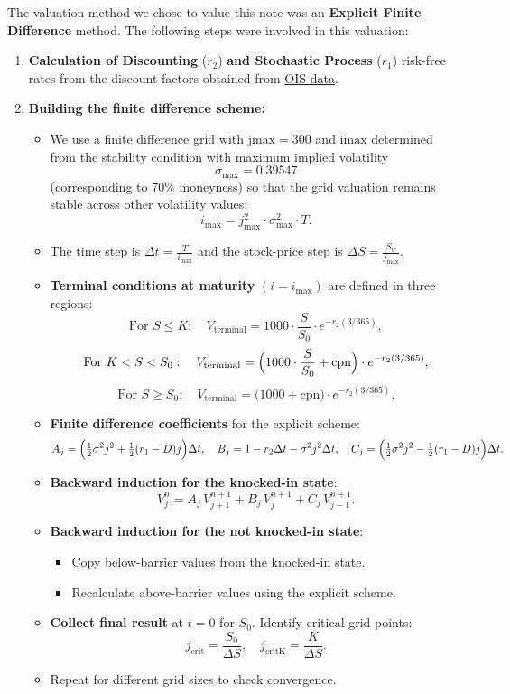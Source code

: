 \documentclass[12pt,a4paper]{article}
\begin{document}
The valuation method we chose to value this note was an \textbf{Explicit Finite Difference} method. The following steps were involved in this valuation:

\begin{enumerate}
\item \textbf{Calculation of Discounting} (\(r_2\)) \textbf{and Stochastic Process} (\(r_1\)) risk-free rates from the discount factors obtained from \hyperref[app:ois]{OIS data}.

\item \textbf{Building the finite difference scheme:}
   \begin{itemize}
   \item We use a finite difference grid with \(\text{jmax} = 300\) and \(\text{imax}\) determined from the stability condition with maximum implied volatility 
   \[
     \sigma_{\text{max}} = 0.39547
   \]
   (corresponding to 70\% moneyness) so that the grid valuation remains stable across other volatility values:
   \[
     i_{\text{max}} = j_{\text{max}}^2 \cdot \sigma_{\text{max}}^2 \cdot T.
   \]
   \item The time step is \(\Delta t = \tfrac{T}{i_{\max}}\) and the stock-price step is \(\Delta S = \tfrac{S_U}{j_{\max}}\).
   \item \textbf{Terminal conditions at maturity} \((i = i_{\max})\) are defined in three regions:
   \[
     \text{For } S \le K: \quad 
       V_{\text{terminal}} = 1000 \cdot \frac{S}{S_0} \cdot e^{-r_2(3/365)},
   \]
   \[
     \text{For } K < S < S_0: \quad
       V_{\text{terminal}} = \Bigl(1000 \cdot \frac{S}{S_0} + \text{cpn}\Bigr)\cdot e^{-r_2(3/365)},
   \]
   \[
     \text{For } S \ge S_0: \quad
       V_{\text{terminal}} = \bigl(1000 + \text{cpn}\bigr)\cdot e^{-r_2(3/365)}.
   \]
   \item \textbf{Finite difference coefficients} for the explicit scheme:
   \[
     A_j = \Bigl(\tfrac{1}{2}\sigma^2 j^2 + \tfrac{1}{2}(r_1 - D)j\Bigr)\Delta t, 
     \quad
     B_j = 1 - r_2\Delta t - \sigma^2 j^2 \Delta t, 
     \quad
     C_j = \Bigl(\tfrac{1}{2}\sigma^2 j^2 - \tfrac{1}{2}(r_1 - D)j\Bigr)\Delta t.
   \]
   \item \textbf{Backward induction for the knocked-in state}: 
   \[
     V_j^n 
       = A_j \, V_{j+1}^{n+1} 
         + B_j \, V_j^{n+1} 
         + C_j \, V_{j-1}^{n+1}.
   \]
   \item \textbf{Backward induction for the not knocked-in state}: 
       \begin{itemize}
       \item Copy below-barrier values from the knocked-in state.
       \item Recalculate above-barrier values using the explicit scheme.
       \end{itemize}
   \item \textbf{Collect final result} at \(t=0\) for \(S_0\). Identify critical grid points:
   \[
     j_{\text{crit}} = \frac{S_0}{\Delta S}, 
     \quad 
     j_{\text{critK}} = \frac{K}{\Delta S}.
   \]
   \item Repeat for different grid sizes to check convergence.
   \end{itemize}


\end{enumerate}
\end{document}
